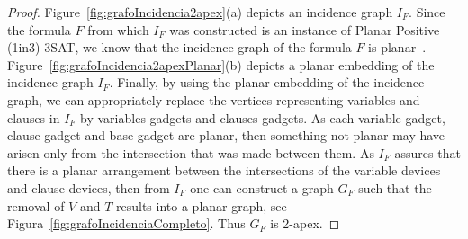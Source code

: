 \documentclass[
submission
]{dmtcs-episciences}
\begin{document}
\begin{proof}
Figure~\ref{fig:grafoIncidencia2apex}(a) depicts an incidence graph $ I_F $. Since the formula $F$ from which $I_F$ was constructed is an instance of {\sc Planar Positive (1in3)-3SAT}, we know that the incidence graph of the formula $F$ is planar~\cite{mulzer2008minimum}.  Figure~\ref{fig:grafoIncidencia2apexPlanar}(b) depicts a planar embedding of the incidence graph $I_F$.
Finally, by using the planar embedding of the incidence graph, we can appropriately replace the vertices representing variables and clauses in  $I_F$ by variables gadgets and clauses gadgets. As each variable gadget, clause gadget and base gadget are planar, then something not planar may have arisen only from the intersection that was made between them. As $I_F$ assures that there is a planar arrangement between the intersections of the variable devices and clause devices, then from $I_F$ one can construct a graph $G_F$ such that the removal of $V$ and $T$ results into a planar graph, see Figura~\ref{fig:grafoIncidenciaCompleto}. Thus $G_F$ is 2-apex.
\end{proof}






%

\end{document}
